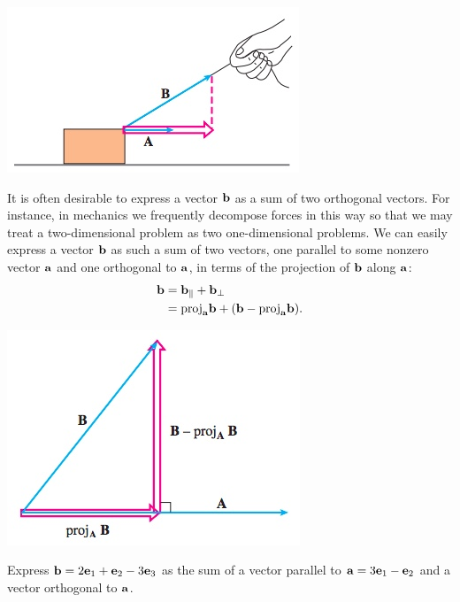 \documentclass[12pt,letterpaper,reqno]{article}
\numberwithin{equation}{section}
\begin{document}
\begin{center}
	\includegraphics[scale=0.5]{figures_mvc/effective_force_box}
\end{center}	

It is often desirable to express a vector ${\bf b}$ as a sum of two orthogonal vectors. For instance, in mechanics we frequently decompose forces in this way so that we may treat a two-dimensional problem as two one-dimensional problems. We can easily express a vector ${\bf b}$ as such a sum of two vectors, one parallel to some nonzero vector ${\bf a}$ and one orthogonal to ${\bf a}$, in terms of the projection of ${\bf b}$ along ${\bf a}$:
\begin{equation}
\begin{split}
	{\bf b}&={\bf b}_{\parallel}+{\bf b}_{\perp} \\
	&=\text{proj}_{\bf a}{\bf b}+({\bf b}-\text{proj}_{\bf a}{\bf b}).
\end{split}
\end{equation}

\begin{center}
	\includegraphics[scale=0.5]{figures_mvc/sum_of_orthogonal_vectors}
\end{center}

\begin{exercise}
	Express ${\bf b}=2{\bf e}_1+{\bf e}_2-3{\bf e}_3$ as the sum of a vector parallel to ${\bf a}=3{\bf e}_1-{\bf e}_2$ and a vector orthogonal to ${\bf a}$.
\end{exercise}
\end{document}
